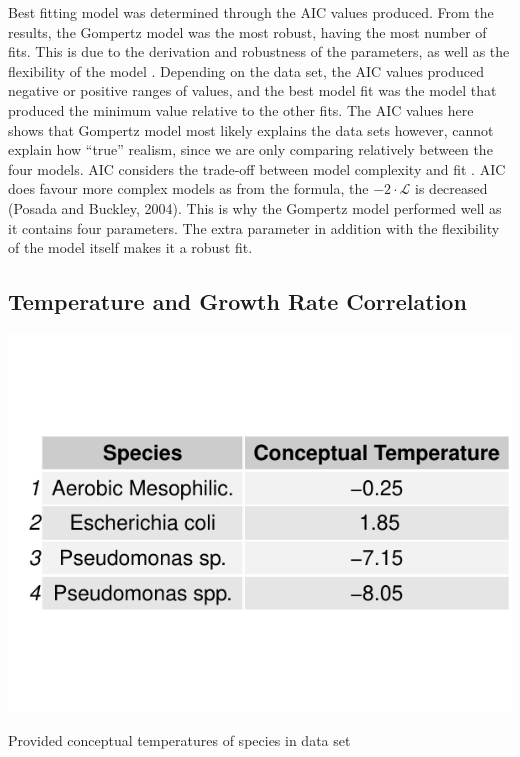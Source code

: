 Best fitting model was determined through the AIC values produced. From the results, the Gompertz model was the most robust, having the most number of fits. This is due to the derivation and robustness of the parameters, as well as the flexibility of the model \cite{tjorve2017use}. Depending on the data set, the AIC values produced negative or positive ranges of values, and the best model fit was the model that produced the minimum value relative to the other fits. The AIC values here shows that Gompertz model most likely explains the data sets however, cannot explain how “true” realism, since we are only comparing relatively between the four models. AIC  considers the trade-off between model complexity and fit \cite{vrieze2012model}. AIC does favour more complex models as from the formula, the $-2 \cdot \mathcal{L}$ is decreased (Posada and Buckley, 2004). This is why the Gompertz model performed well as it contains four parameters. The extra parameter in addition with the flexibility of the model itself makes it a robust fit.

\newpage

\subsection{Temperature and Growth Rate Correlation}
\begin{table}[h!]
\centering
\includegraphics[scale=0.60]{../Results/Species_ConceptualTemp.pdf} \caption{Provided conceptual temperatures of species in data set} \label{tab:Conceptual Temperature}
\end{table}

